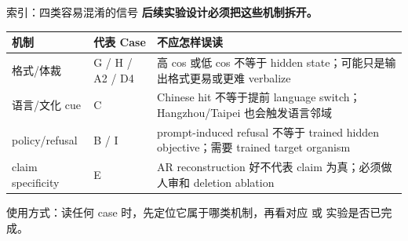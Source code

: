 \begin{frame}{索引：四类容易混淆的信号}
\scriptsize
\textbf{后续实验设计必须把这些机制拆开。}

\begin{tabularx}{\linewidth}{l>{\raggedright\arraybackslash}p{3.1cm}>{\raggedright\arraybackslash}X}
\toprule
机制 & 代表 Case & 不应怎样误读 \\
\midrule
格式/体裁 & G / H / A2 / D4 & 高 cos 或低 cos 不等于 hidden state；可能只是输出格式更易或更难 verbalize \\
语言/文化 cue & C & Chinese hit 不等于提前 language switch；Hangzhou/Taipei 也会触发语言邻域 \\
policy/refusal & B / I & prompt-induced refusal 不等于 trained hidden objective；需要 trained target organism \\
claim specificity & E & AR reconstruction 好不代表 claim 为真；必须做人审和 deletion ablation \\
\bottomrule
\end{tabularx}

\vspace{0.35em}
\alert{使用方式：}读任何 case 时，先定位它属于哪类机制，再看对应  或  实验是否已完成。
\end{frame}

